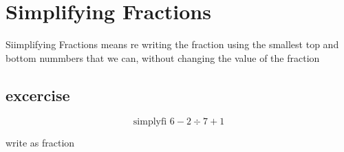 \documentclass[12pt]{article}
\begin{document}
\section{Simplifying Fractions}


Siimplifying Fractions means re writing the fraction using the 
smallest top and bottom nummbers that we can, without changing the value of 
the fraction 

\subsection{excercise}
$$ \text{simplyfi } 6 - 2 \div 7 + 1 $$

write as fraction

$$ $$
\end{document}
